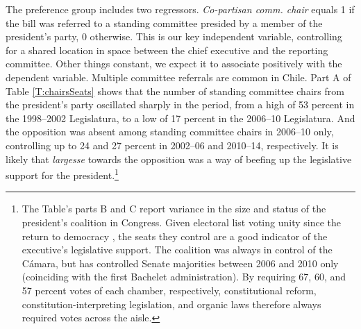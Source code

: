 \documentclass[letter,12pt]{article}
\begin{document}
The preference group includes two regressors. \emph{Co-partisan comm. chair} equals 1 if the bill was referred to a standing committee presided by a member of the president's party, 0 otherwise. This is our key independent variable, controlling for a shared location in space between the chief executive and the reporting committee. Other things constant, we expect it to associate positively with the dependent variable. Multiple committee referrals are common in Chile. Part A of Table \ref{T:chairsSeats} shows that the number of standing committee chairs from the president's party oscillated sharply in the period, from a high of 53 percent in the 1998--2002 Legislatura, to a low of 17 percent in the 2006--10 Legislatura. And the opposition was absent among standing committee chairs in 2006--10 only, controlling up to 24 and 27 percent in 2002--06 and 2010--14, respectively. It is likely that \emph{largesse} towards the opposition was a way of beefing up the legislative support for the president.\footnote{The Table's parts B and C report variance in the size and status of the president's coalition in Congress. Given electoral list voting unity since the return to democracy \citep{carey.2002,aleman.saiegh.coalUnityChile.2007}, the seats they control are a good indicator of the executive's legislative support. The coalition was always in control of the Cámara, but has controlled Senate majorities between 2006 and 2010 only (coinciding with the first Bachelet administration). By requiring 67, 60, and 57 percent votes of each chamber, respectively, constitutional reform, constitution-interpreting legislation, and organic laws therefore always required votes across the aisle.}
\end{document}

